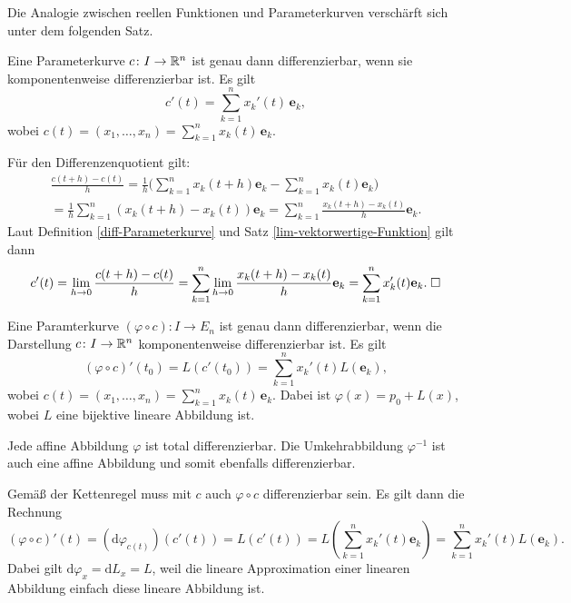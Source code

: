 \noindent
Die Analogie zwischen reellen Funktionen und Parameterkurven
verschärft sich unter dem folgenden Satz.

\begin{theorem}
Eine Parameterkurve $c\colon I\to\mathbb R^n$ ist genau dann
differenzierbar, wenn sie komponentenweise differenzierbar
ist. Es gilt
\begin{equation}
c'(t) = \sum_{k=1}^n x_k'(t)\,\mathbf e_k,
\end{equation}
wobei $c(t)=(x_1,\ldots,x_n)=\sum_{k=1}^n x_k(t)\,\mathbf e_k$.
\end{theorem}

\noindent{}
Für den Differenzenquotient gilt:
\begin{gather}
\frac{c(t+h)-c(t)}{h}
= \frac{1}{h}\bigg(\sum_{k=1}^n x_k(t+h)\mathbf e_k-\sum_{k=1}^n x_k(t)\mathbf e_k\bigg)\\
= \frac{1}{h}\sum_{k=1}^n (x_k(t+h)-x_k(t))\mathbf e_k
= \sum_{k=1}^n \frac{x_k(t+h)-x_k(t)}{h}\mathbf e_k.
\end{gather}
Laut Definition \ref{diff-Parameterkurve} und
Satz \ref{lim-vektorwertige-Funktion} gilt dann
\begin{equation}
c'(t) = \lim_{h\to 0}\frac{c(t+h)-c(t)}{h}
= \sum_{k=1}^n \lim_{h\to 0}\frac{x_k(t+h)-x_k(t)}{h}\mathbf e_k
= \sum_{k=1}^n x_k'(t)\mathbf e_k.\;\Box
\end{equation}

\begin{theorem}
Eine Paramterkurve $(\varphi\circ c)\colon I\to E_n$ ist genau dann
differenzierbar, wenn die Darstellung $c\colon I\to\mathbb R^n$
komponentenweise differenzierbar ist. Es gilt
\begin{equation}
(\varphi\circ c)'(t_0) = L(c'(t_0))
= \sum_{k=1}^n x_k'(t) L(\mathbf e_k),
\end{equation}
wobei $c(t) = (x_1,\ldots,x_n) = \sum_{k=1}^n x_k(t)\,\mathbf e_k$.
Dabei ist $\varphi(x) = p_0+L(x)$, wobei $L$ eine bijektive lineare
Abbildung ist.
\end{theorem}

\noindent{}
Jede affine Abbildung $\varphi$ ist total differenzierbar. Die
Umkehrabbildung $\varphi^{-1}$ ist auch eine affine Abbildung und
somit ebenfalls differenzierbar.

Gemäß der Kettenregel muss mit $c$ auch $\varphi\circ c$
differenzierbar sein. Es gilt dann die Rechnung%
\begin{equation}
(\varphi\circ c)'(t) = (\mathrm d\varphi_{c(t)})(c'(t))
= L(c'(t)) = L(\sum_{k=1}^n x_k'(t)\mathbf e_k)
= \sum_{k=1}^n x_k'(t)L(\mathbf e_k).
\end{equation}
Dabei gilt $\mathrm d\varphi_x = \mathrm dL_x = L$, weil die lineare
Approximation einer linearen Abbildung einfach diese lineare Abbildung
ist.

